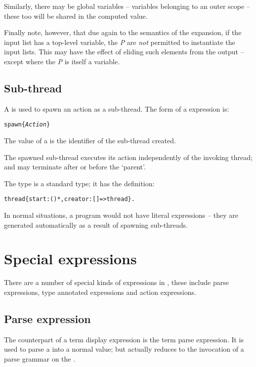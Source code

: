 Similarly, there may be global variables -- variables belonging to an outer scope -- these too will be shared in the computed value.

Finally note, however, that due again to the semantics of the expansion, if the input list has a top-level variable, the \emph{P\subi} are \emph{not} permitted to instantiate the input lists. This may have the effect of eliding such elements from the output -- except where the \emph{P\subi} is itself a variable.

\subsection{Sub-thread }
\label{expression:spawn}

A  is used to spawn an action as a sub-thread. The form of a  expression is:
\begin{alltt}
spawn \{ \emph{Action} \}
\end{alltt}
The value of a  is the  identifier of the sub-thread created. 

The spawned sub-thread executes its action independently of the invoking thread; and may terminate after or before the `parent'. 

The  type is a standard \go type; it has the definition:
\begin{alltt}
thread \impl \{ start:()*, creator:[]=>thread \}.
\end{alltt}
In normal situations, a \go program would not have literal  expressions -- they are generated automatically as a result of spawning sub-threads. 


\section{Special expressions}
\label{expression:special}

There are a number of special kinds of expressions in \go, these include parse expressions, type annotated expressions and action expressions.

\subsection{Parse expression}
\label{expression:grammarexp}
The counterpart of a term display expression is the term parse expression. It is used to parse a  into a normal value; but actually reduces to the invocation of a parse grammar on the .

